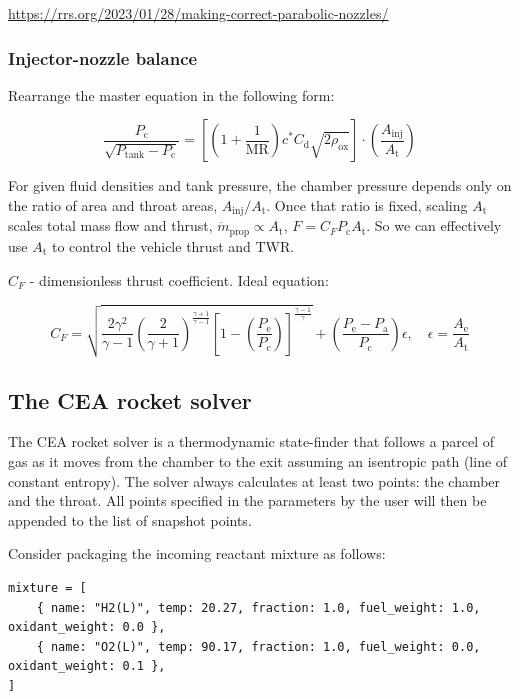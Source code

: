 \documentclass[fleqn]{article}
\begin{document}
\url{https://rrs.org/2023/01/28/making-correct-parabolic-nozzles/}
\subsubsection{Injector-nozzle balance}
\label{sec:org0c48826}

Rearrange the master equation in the following form:

\begin{equation*}
\frac{P_\text{c}}{\sqrt{P_\text{tank} - P_\text{c}}}
= \left[
    \left(1 + \frac{1}{\mathrm{MR}}\right)
    c^* C_\text{d} \sqrt{2\rho_\text{ox}}
  \right]
  \cdot \left(\frac{A_\text{inj}}{A_\text{t}}\right)
\end{equation*}

For given fluid densities and tank pressure, the chamber pressure depends only
on the ratio of area and throat areas, \(A_\text{inj}/A_\text{t}\). Once that
ratio is fixed, scaling \(A_\text{t}\) scales total mass flow and thrust,
\(\dot{m}_\text{prop}\propto A_\text{t}\), \(F=C_F P_\text{c}A_\text{t}\). So we can
effectively use \(A_\text{t}\) to control the vehicle thrust and TWR.

\(C_F\) - dimensionless thrust coefficient. Ideal equation:

\begin{equation*}
C_F
= \sqrt{
    \frac{2\gamma^2}{\gamma - 1}
    \left(\frac{2}{\gamma + 1}\right)^{\frac{\gamma+1}{\gamma-1}}
    \left[
      1 - \left(\frac{P_\text{e}}{P_\text{c}}\right)
    \right]^{\frac{\gamma-1}{\gamma}}
  } + \left(\frac{P_\text{e} - P_\text{a}}{P_\text{c}}\right) \epsilon,
\quad
\epsilon = \frac{A_\text{e}}{A_\text{t}}
\end{equation*}
\subsection{The CEA rocket solver}
\label{sec:orgef8b5e4}

The CEA rocket solver is a thermodynamic state-finder that follows a parcel of
gas as it moves from the chamber to the exit assuming an isentropic path (line
of constant entropy). The solver always calculates at least two points: the
chamber and the throat. All points specified in the parameters by the user will
then be appended to the list of snapshot points.

Consider packaging the incoming reactant mixture as follows:

\begin{verbatim}
mixture = [
    { name: "H2(L)", temp: 20.27, fraction: 1.0, fuel_weight: 1.0, oxidant_weight: 0.0 },
    { name: "O2(L)", temp: 90.17, fraction: 1.0, fuel_weight: 0.0, oxidant_weight: 0.1 },
]
\end{verbatim}
\end{document}
